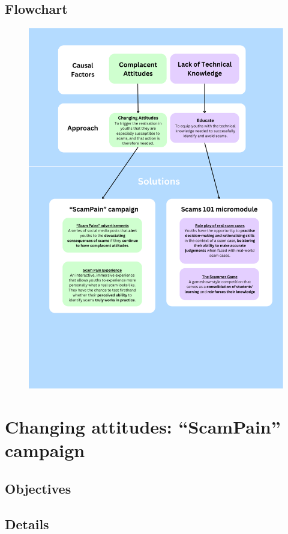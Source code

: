 \documentclass[a4paper]{article}
\begin{document}
\subsection{Flowchart}
\begin{figure}[ht!]
  \centering \includegraphics[width=\textwidth]{flowchart}\label{fig:flowchart}
\end{figure}

\section{Changing attitudes: ``ScamPain'' campaign}
\subsection{Objectives}
\subsection{Details}
\end{document}
